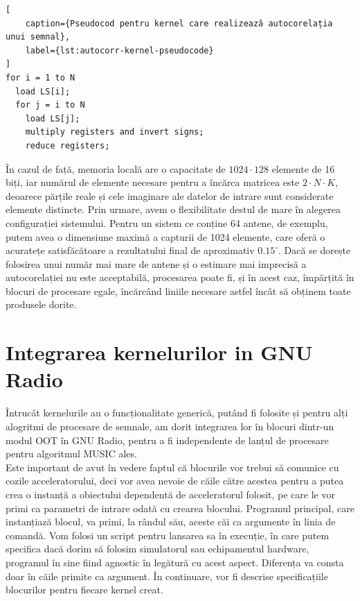 \begin{lstlisting}[
    caption={Pseudocod pentru kernel care realizează autocorelația unui semnal},
    label={lst:autocorr-kernel-pseudocode}
]
for i = 1 to N
  load LS[i];
  for j = i to N
    load LS[j];
    multiply registers and invert signs;
    reduce registers;
\end{lstlisting}

În cazul de față, memoria locală are o capacitate de $1024 \cdot 128$ elemente
de 16 biți, iar numărul de elemente necesare pentru a încărca matricea este $2
\cdot N \cdot K$, deoarece părțile reale și cele imaginare ale datelor de
intrare sunt considerate elemente distincte. Prin urmare, avem o flexibilitate
destul de mare în alegerea configurației sistemului. Pentru un sistem ce conține
64 antene, de exemplu, putem avea o dimensiune maximă a capturii de 1024
elemente, care oferă o acuratețe satisfăcătoare a rezultatului final de aproximativ
$0.15^{\circ}$. Dacă se dorește folosirea unui număr mai mare de antene și o
estimare mai imprecisă a autocorelației nu este acceptabilă, procesarea poate
fi, și în acest caz, împărțită în blocuri de procesare egale, încărcând liniile
necesare astfel încât să obținem toate produsele dorite.

\section{Integrarea kernelurilor in GNU Radio}
\label{sec:kernel-integrate}

Întrucât kernelurile au o funcționalitate generică, putând fi folosite și pentru
alți alogritmi de procesare de semnale, am dorit integrarea lor în blocuri
dintr-un modul OOT în GNU Radio, pentru a fi independente de lanțul de procesare
pentru algoritmul MUSIC ales. \\

Este important de avut în vedere faptul că blocurile vor trebui să comunice cu
cozile acceleratorului, deci vor avea nevoie de căile către acestea pentru a
putea crea o instanță a obiectului  dependentă de
acceleratorul folosit, pe care le vor primi ca parametri de intrare odată cu
crearea blocului. Programul principal, care instanțiază blocul, va primi, la
rândul său, aceste căi ca argumente în linia de comandă. Vom folosi un script
pentru lansarea sa în execuție, în care putem specifica dacă dorim să folosim
simulatorul sau echipamentul hardware, programul în sine fiind agnostic în
legătură cu acest aspect. Diferența va consta doar în căile primite ca argument.
În continuare, vor fi descrise specificațiile blocurilor pentru fiecare kernel
creat.

